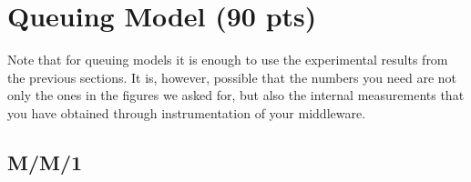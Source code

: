 \documentclass[11pt,a4paper]{article}
\begin{document}
\section{Queuing Model (90 pts)}

Note that for queuing models it is enough to use the experimental results from the previous sections. It is, however, possible that the numbers you need are not only the ones in the figures we asked for, but also the internal measurements that you have obtained through instrumentation of your middleware.

\subsection{M/M/1} \label{sec7.1}

\end{document}
